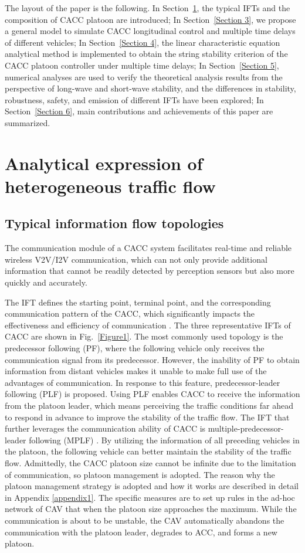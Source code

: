 \documentclass[journal]{IEEEtran}
\begin{document}
The layout of the paper is the following. In Section~\ref{Section 2}, the typical IFTs and the composition of CACC platoon are introduced; In Section~\ref{Section 3}, we propose a general model to simulate CACC longitudinal control and multiple time delays of different vehicles; In Section~\ref{Section 4}, the linear characteristic equation analytical method is implemented to obtain the string stability criterion of the CACC platoon controller under multiple time delays; In Section~\ref{Section 5}, numerical analyses are used to verify the theoretical analysis results from the perspective of long-wave and short-wave stability, and the differences in stability, robustness, safety, and emission of different IFTs have been explored; In Section~\ref{Section 6}, main contributions and achievements of this paper are summarized.

\section{Analytical expression of heterogeneous traffic flow}
\label{Section 2}
\subsection{Typical information flow topologies}
The communication module of a CACC system facilitates real-time and reliable wireless V2V/I2V communication, which can not only provide additional information that cannot be readily detected by perception sensors but also more quickly and accurately.


The IFT defines the starting point, terminal point, and the corresponding communication pattern of the CACC, which significantly impacts the effectiveness and efficiency of communication \citep{zheng2015stability}. The three representative IFTs of CACC are shown in Fig.~\ref{Figure1}. The most commonly used topology is the predecessor following (PF), where the following vehicle only receives the communication signal from its predecessor. However, the inability of PF to obtain information from distant vehicles makes it unable to make full use of the advantages of communication. In response to this feature, predecessor-leader following (PLF) is proposed. Using PLF enables CACC to receive the information from the platoon leader, which means perceiving the traffic conditions far ahead to respond in advance to improve the stability of the traffic flow. The IFT that further leverages the communication ability of CACC is multiple-predecessor-leader following (MPLF) \citep{jia2015survey,ma2020stability}. By utilizing the information of all preceding vehicles in the platoon, the following vehicle can better maintain the stability of the traffic flow. Admittedly, the CACC platoon size cannot be infinite due to the limitation of communication, so platoon management is adopted. The reason why the platoon management strategy is adopted and how it works are described in detail in Appendix \ref{appendix1}. The specific measures are to set up rules in the ad-hoc network of CAV that when the platoon size approaches the maximum. While the communication is about to be unstable, the CAV automatically abandons the communication with the platoon leader, degrades to ACC, and forms a new platoon.
\end{document}
